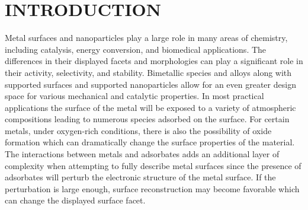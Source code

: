 %

\chapter{INTRODUCTION}
\label{chap:intro}
Metal surfaces and nanoparticles play a large role in many areas of chemistry,
including catalysis,\citep{Clemens-Burda:2005qa, Sambur:2014mi} energy
conversion,\citep{Sneed:2014fj, Han:2015qr} and biomedical
applications.\citep{Padmos:0qf, Nicklin:0ss} The differences in their displayed
facets and morphologies can play a significant role in their
activity,\citep{Chiu:2012ec, Stephens:2011bv} selectivity,\citep{Yi:0qq} and
stability.\citep{Zhang:2015ys, Zhang:2007uq} Bimetallic species and alloys
along with supported surfaces and supported nanoparticles allow for an even
greater design space for various mechanical\citep{Cao:2010gf, Huang:2012ul} and
catalytic properties.\citep{Han:2015qr, Yu:2012by, Kim:2013mi, Jenness:2013oj}  In
most practical applications the surface of the metal will be exposed to a
variety of atmospheric compositions leading to numerous species adsorbed on the
surface.  For certain metals, under oxygen-rich conditions, there is also the
possibility of oxide formation which can dramatically change the surface
properties of the material.\citep{Streitz:1994mw, Derouin:2015kx} The
interactions between metals and adsorbates adds an additional layer of
complexity when attempting to fully describe metal surfaces since the presence
of adsorbates will perturb the electronic structure of the metal surface. If
the perturbation is large enough, surface reconstruction may become favorable which can
change the displayed surface facet.\citep{Kim:2013mi, Tao:2010aa, Tao:2008aa}

